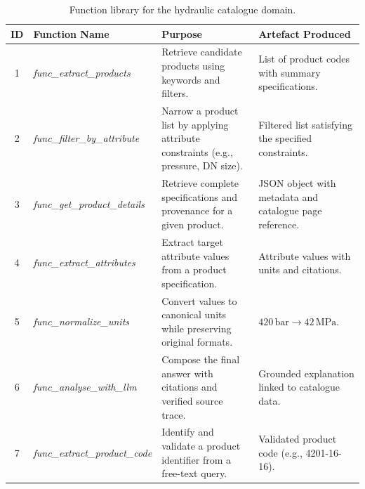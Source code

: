 \documentclass[largeformat]{interact}
\begin{document}
\begin{table}[!htbp]
\captionsetup{width=0.92\linewidth, skip=2pt}
    \caption{Function library for the hydraulic catalogue domain.}
    \label{tab:agent_functions_hydraulic_catalogue}
    \centering
    \small
    \setlength{\tabcolsep}{5pt}
    \renewcommand{\arraystretch}{1}
    \begin{tabularx}{\textwidth}{c >{\raggedright\arraybackslash}p{4cm} p{5.8cm} X}
    \toprule
    \textbf{ID} & 
    \textbf{Function Name} & 
    \textbf{Purpose} &
    \textbf{Artefact Produced} \\
    \midrule
    1 & \textit{func\_extract\_products} &
    Retrieve candidate products using keywords and filters. &
    List of product codes with summary specifications. \\
    \midrule
    2 & \textit{func\_filter\_by\_attribute} &
    Narrow a product list by applying attribute constraints (e.g., pressure, DN size). &
    Filtered list satisfying the specified constraints. \\
    \midrule
    3 & \textit{func\_get\_product\_details} &
    Retrieve complete specifications and provenance for a given product. &
    JSON object with metadata and catalogue page reference. \\
    \midrule
    4 & \textit{func\_extract\_attributes} &
    Extract target attribute values from a product specification. &
    Attribute values with units and citations. \\
    \midrule
    5 & \textit{func\_normalize\_units} &
    Convert values to canonical units while preserving original formats. &
    \(420\,\text{bar} \rightarrow 42\,\text{MPa}\). \\
    \midrule
    6 & \textit{func\_analyse\_with\_llm} &
    Compose the final answer with citations and verified source trace. &
    Grounded explanation linked to catalogue data. \\
    \midrule
    7 & \textit{func\_extract\_product\_code} &
    Identify and validate a product identifier from a free-text query. &
    Validated product code (e.g., 4201-16-16). \\
    \bottomrule
    \end{tabularx}
\end{table}
\end{document}
